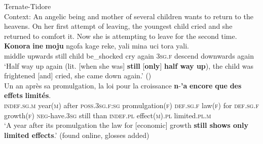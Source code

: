 \begin{exe}
	\ex Ternate-Tidore \label{exScalarIncreaseTernate}\\
	 Context: An angelic being and mother of several children wants to return to the heavens. On her first attempt of leaving, the youngest child cried and she returned to comfort it. Now she is attempting to leave for the second time.\\
	\gll \textbf{Konora} \textbf{ine} \textbf{moju} ngofa kage reke, yali mina uci tora yali.\\
	middle upwards still child be\_shocked cry again 3\textsc{sg}.\textsc{f} descend downwards again\\
	\glt \lq Half way up again (lit. [when she was] \textbf{still} [\textbf{only}] \textbf{half way up}), the child was frightened [and] cried, she came down again.' (\cite[375]{vanStaden2000})
		\ex {}\label{exScalarIncreaseFrench}\\
	\gll Un an après sa promulgation, la loi pour la croissance \textbf{n}-\textbf{'a} \textbf{encore} \textbf{que} \textbf{des} \textbf{effets} \textbf{limités}.\\
	\textsc{indef}.\textsc{sg}.\textsc{m} year(\textsc{m}) after \textsc{poss}.3\textsc{sg}.\textsc{f}:\textsc{sg} promulgation(\textsc{f}) \textsc{def}.\textsc{sg}.\textsc{f} law(\textsc{f}) for \textsc{def}.\textsc{sg}.\textsc{f} growth(\textsc{f}) \textsc{neg}-have.3\textsc{sg} still than \textsc{indef}.\textsc{pl} effect(\textsc{m}).\textsc{pl} limited.\textsc{pl}.\textsc{m}\\
	\glt \lq A year after its promulgation the law for [economic] growth \textbf{still shows only limited effects}.\rq{ }(found online, glosses added)%
\end{exe}


